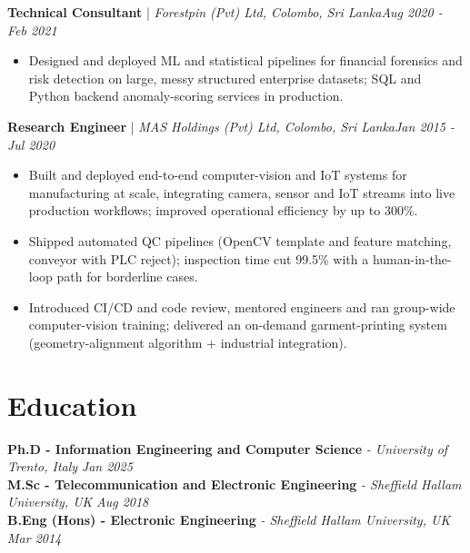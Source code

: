 \documentclass[11pt]{article}
\newenvironment{cvrole}[5]{%
  \par\noindent\textbf{\large #1} | \textit{\small #2, #3}\hfill \textit{\small #4 - #5}\par
  \begin{itemize}[leftmargin=2em, itemsep=-0.3em, topsep=-0.5em]%
}{%
  \end{itemize}\par\noindent\mbox{}\par\vspace{0.1em}%
}
\begin{document}
\begin{cvrole}{Technical Consultant}{Forestpin (Pvt) Ltd}{Colombo, Sri Lanka}{Aug 2020}{Feb 2021}
    \item Designed and deployed ML and statistical pipelines for financial forensics and risk detection on large, messy structured enterprise datasets; SQL and Python backend anomaly-scoring services in production.
\end{cvrole}

\begin{cvrole}{Research Engineer}{MAS Holdings (Pvt) Ltd}{Colombo, Sri Lanka}{Jan 2015}{Jul 2020}
    \item Built and deployed end-to-end computer-vision and IoT systems for manufacturing at scale, integrating camera, sensor and IoT streams into live production workflows; improved operational efficiency by up to 300\%.
    \item Shipped automated QC pipelines (OpenCV template and feature matching, conveyor with PLC reject); inspection time cut 99.5\% with a human-in-the-loop path for borderline cases.
    \item Introduced CI/CD and code review, mentored engineers and ran group-wide computer-vision training; delivered an on-demand garment-printing system (geometry-alignment algorithm + industrial integration).
\end{cvrole}


\section*{Education}
\textbf{Ph.D - Information Engineering and Computer Science} \textit{\small{ - University of Trento, Italy}} \hfill \textit{Jan 2025}\\[2pt]
\noindent\textbf{M.Sc - Telecommunication and Electronic Engineering} \textit{\small{ - Sheffield Hallam University, UK}} \hfill \textit{Aug 2018}\\[2pt]
\noindent\textbf{B.Eng (Hons) - Electronic Engineering} \textit{\small{ - Sheffield Hallam University, UK}} \hfill \textit{Mar 2014}
\end{document}
